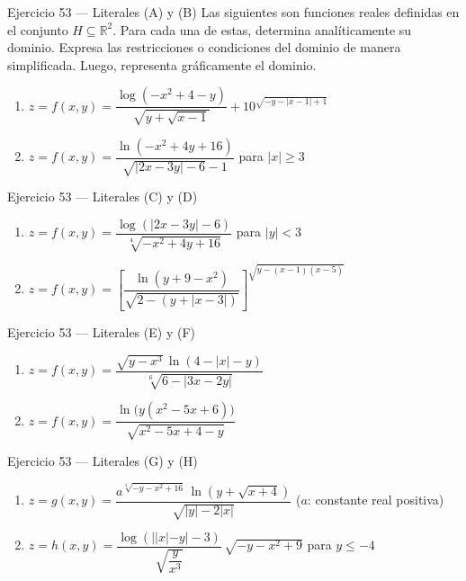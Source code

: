\documentclass[aspectratio=169, 10pt]{beamer}
\begin{document}
\begin{frame}{Ejercicio 53 — Literales (A) y (B)}
  \small
  Las siguientes son funciones reales definidas en el conjunto $H \subseteq \mathbb{R}^2$. Para cada una de estas, determina analíticamente su dominio. Expresa las restricciones o condiciones del dominio de manera simplificada. Luego, representa gráficamente el dominio.

  \medskip
  \begin{enumerate}
    \item[(A)] $z = f(x,y) = \dfrac{\log(-x^2 + 4 - y)}{\sqrt{y + \sqrt{x-1}}} + 10^{\sqrt{-y - |x-1| + 1}}$
    \vspace{2.2cm}
    \item[(B)] $z = f(x,y) = \dfrac{\ln(-x^2 + 4y + 16)}{\sqrt{|2x - 3y| - 6} - 1}$ \quad para $|x| \ge 3$
  \end{enumerate}
  \vfill
\end{frame}

\begin{frame}{Ejercicio 53 — Literales (C) y (D)}
  \small
  \begin{enumerate}
    \item[(C)] $z = f(x,y) = \dfrac{\log(|2x - 3y| - 6)}{\sqrt[4]{-x^2 + 4y + 16}}$ \quad para $|y| < 3$
    \vspace{2.6cm}
    \item[(D)] $z = f(x,y) = \left[\dfrac{\ln(y + 9 - x^2)}{\sqrt{2 - (y + |x-3|)}}\right]^{\sqrt{y - (x-1)(x-5)}}$
  \end{enumerate}
  \vfill
\end{frame}

\begin{frame}{Ejercicio 53 — Literales (E) y (F)}
  \small
  \begin{enumerate}
    \item[(E)] $z = f(x,y) = \dfrac{\sqrt{y - x^3}\,\ln(4 - |x| - y)}{\sqrt[6]{6 - |3x - 2y|}}$
    \vspace{2.6cm}
    \item[(F)] $z = f(x,y) = \dfrac{\ln\big(y(x^2 - 5x + 6)\big)}{\sqrt{x^2 - 5x + 4 - y}}$
  \end{enumerate}
  \vfill
\end{frame}

\begin{frame}{Ejercicio 53 — Literales (G) y (H)}
  \small
  \begin{enumerate}
    \item[(G)] $z = g(x,y) = \dfrac{a^{\sqrt[4]{-y - x^2 + 16}}\,\ln(y + \sqrt{x+4})}{\sqrt{|y| - 2|x|}}$ \quad ($a$: constante real positiva)
    \vspace{2.6cm}
    \item[(H)] $z = h(x,y) = \dfrac{\log(||x| - y| - 3)}{\sqrt{\dfrac{y}{x^3}}}\,\sqrt{-y - x^2 + 9}$ \quad para $y \le -4$
  \end{enumerate}
  \vfill
\end{frame}
\end{document}
